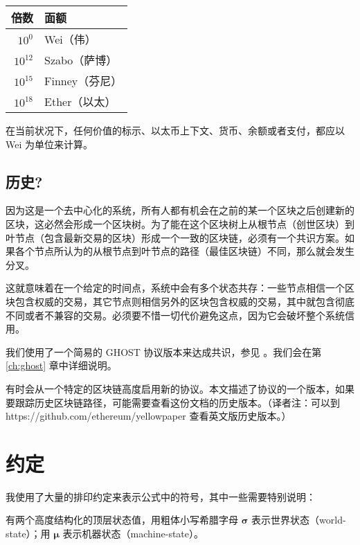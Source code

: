 \documentclass[9pt,oneside]{amsart}
\begin{document}
\begin{multicols}{2}
\par
\begin{center}
\begin{tabular}{rl}
\toprule
倍数 & 面额 \\
\midrule
$10^0$ & Wei（伟） \\
$10^{12}$ & Szabo（萨博） \\
$10^{15}$ & Finney（芬尼） \\
$10^{18}$ & Ether（以太） \\
\bottomrule
\end{tabular}
\end{center}
\par

在当前状况下，任何价值的标示、以太币上下文、货币、余额或者支付，都应以 Wei 为单位来计算。

\subsection{历史?}

因为这是一个去中心化的系统，所有人都有机会在之前的某一个区块之后创建新的区块，这必然会形成一个区块树。为了能在这个区块树上从根节点（创世区块）到叶节点（包含最新交易的区块）形成一个一致的区块链，必须有一个共识方案。如果各个节点所认为的从根节点到叶节点的路径（最佳区块链）不同，那么就会发生分叉。

这就意味着在一个给定的时间点，系统中会有多个状态共存：一些节点相信一个区块包含权威的交易，其它节点则相信另外的区块包含权威的交易，其中就包含彻底不同或者不兼容的交易。必须要不惜一切代价避免这点，因为它会破坏整个系统信用。


我们使用了一个简易的 GHOST 协议版本来达成共识，参见 \cite{cryptoeprint:2013:881}。我们会在第 \ref{ch:ghost} 章中详细说明。

有时会从一个特定的区块链高度启用新的协议。本文描述了协议的一个版本，如果要跟踪历史区块链路径，可能需要查看这份文档的历史版本。（译者注：可以到 https://github.com/ethereum/yellowpaper 查看英文版历史版本。）

\section{约定}\label{ch:conventions}

我使用了大量的排印约定来表示公式中的符号，其中一些需要特别说明：

有两个高度结构化的顶层状态值，用粗体小写希腊字母 $\boldsymbol{\sigma}$ 表示世界状态（world-state）；用 $\boldsymbol{\mu}$ 表示机器状态（machine-state）。


\end{multicols}
\end{document}
